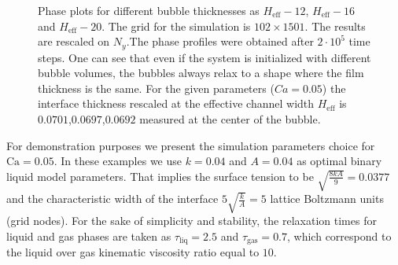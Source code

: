 \documentclass[preprint,12pt]{elsarticle}
\newcommand{\Ca}{\mathrm{Ca}}
\begin{document}
\begin{figure}
\caption{Phase plots for different bubble thicknesses as
$H_{\mathrm{eff}}-12$, $H_{\mathrm{eff}}-16$ and
$H_{\mathrm{eff}}-20$. The grid for the simulation is $102 \times 1501$. The results are rescaled
on $N_y$.The phase
profiles were obtained after $2\cdot10^5$ time steps. One can see that even if the
system is initialized with different bubble volumes, the bubbles always relax
to a shape where the film thickness is the same. For the given parameters ($Ca=0.05$) the
interface thickness rescaled at the effective channel width $H_{\mathrm{eff}}$  is
$0.0701$,$0.0697$,$0.0692$ measured at the {\color{red} center of the bubble}.
\label{fig:different:initialization:widths}}
\end{figure}

{\color{red}
For demonstration purposes we present the simulation parameters choice for $\Ca=0.05$.
In these
examples we use $k=0.04$ and $A=0.04$ as optimal binary liquid model parameters.
That implies the surface tension to be $\sqrt{\frac{8 k
A}{9}}=0.0377$ and the characteristic width of the interface
$5\sqrt{\frac{k}{A}}=5$ lattice Boltzmann units (grid nodes). For the sake of simplicity and
stability, the relaxation times for liquid and gas phases are taken as
$\tau_{\mathrm{liq}}=2.5$ and $\tau_{\mathrm{gas}}=0.7$, which correspond
to the liquid over gas kinematic viscosity ratio equal to $10$.

}
\end{document}
